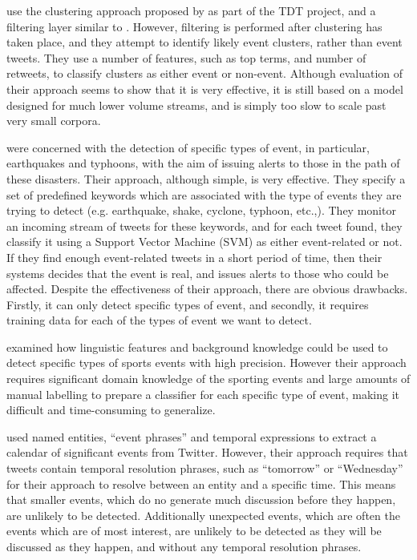 \cite{becker2011beyond} use the clustering approach proposed by \cite{Yang98} as part of the TDT project, and a filtering layer similar to \cite{sankaranarayanan2009twitterstand}. However, filtering is performed after clustering has taken place, and they attempt to identify likely event clusters, rather than event tweets. They use a number of features, such as top terms, and number of retweets, to classify clusters as either event or non-event. Although evaluation of their approach seems to show that it is very effective, it is still based on a model designed for much lower volume streams, and is simply too slow to scale past very small corpora.

\cite{Sakaki:2010:EST:1772690.1772777} were concerned with the detection of specific types of event, in particular, earthquakes and typhoons, with the aim of issuing alerts to those in the path of these disasters. Their approach, although simple, is very effective. They specify a set of predefined keywords which are associated with the type of events they are trying to detect (e.g. earthquake, shake, cyclone, typhoon, etc.,). They monitor an incoming stream of tweets for these keywords, and for each tweet found, they classify it using a Support Vector Machine (SVM) as either event-related or not. If they find enough event-related tweets in a short period of time, then their systems decides that the event is real, and issues alerts to those who could be affected. Despite the effectiveness of their approach, there are obvious drawbacks. Firstly, it can only detect specific types of event, and secondly, it requires training data for each of the types of event we want to detect.

\cite{Choudhury11extractingsemantic} examined how linguistic features and background knowledge could be used to detect specific types of sports events with high precision. However their approach requires significant domain knowledge of the sporting events and large amounts of manual labelling to prepare a classifier for each specific type of event, making it difficult and time-consuming to generalize.

\cite{Ritter:2012:ODE:2339530.2339704} used named entities, ``event phrases'' and temporal expressions to extract a calendar of significant events from Twitter.
However, their approach requires that tweets contain temporal resolution phrases, such as ``tomorrow'' or ``Wednesday'' for their approach to resolve between an entity and a specific time.
This means that smaller events, which do no generate much discussion before they happen, are unlikely to be detected. Additionally unexpected events, which are often the events which are of most interest, are unlikely to be detected as they will be discussed as they happen, and without any temporal resolution phrases.

